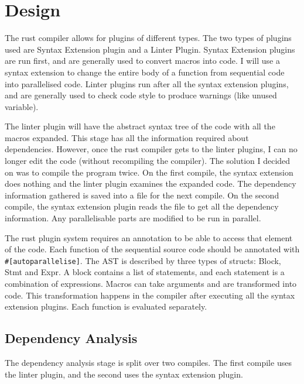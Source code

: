 \chapter{Design}

The rust compiler allows for plugins of different types. The two types of plugins used are Syntax Extension plugin and a Linter Plugin. Syntax Extension plugins are run first, and are generally used to convert macros into code. I will use a syntax extension to change the entire body of a function from sequential code into parallelised code. Linter plugins run after all the syntax extension plugins, and are generally used to check code style to produce warnings (like unused variable).

The linter plugin will have the abstract syntax tree of the code with all the macros expanded. This stage has all the information required about dependencies. However, once the rust compiler gets to the linter plugins, I can no longer edit the code (without recompiling the compiler). The solution I decided on was to compile the program twice. On the first compile, the syntax extension does nothing and the linter plugin examines the expanded code. The dependency information gathered is saved into a file for the next compile. On the second compile, the syntax extension plugin reads the file to get all the dependency information. Any parallelisable parts are modified to be run in parallel.

The rust plugin system requires an annotation to be able to access that element of the code. Each function of the sequential source code should be annotated with \texttt{\#[autoparallelise]}. The AST is described by three types of structs: Block, Stmt and Expr. A block contains a list of statements, and each statement is a combination of expressions. Macros can take arguments and are transformed into code. This transformation happens in the compiler after executing all the syntax extension plugins. Each function is evaluated separately.

\section{Dependency Analysis}
The dependency analysis stage is split over two compiles. The first compile uses the linter plugin, and the second uses the syntax extension plugin.

